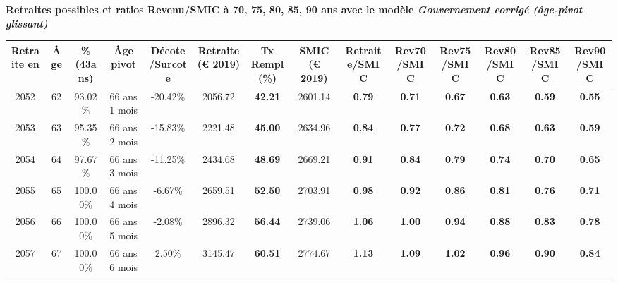  \vspace{0.1cm} 
{\bf \noindent Retraites possibles et ratios Revenu/SMIC à 70, 75, 80, 85, 90 ans avec le modèle \emph{Gouvernement corrigé (âge-pivot glissant)}}  
 
\begin{adjustbox}{max width=\textwidth} 
\begin{tabular}[htb]{|c|c||c|c|c||c|c||c||c|c|c|c|c|c|} 
\hline 
 Retraite en &  Âge &  \%(43ans) &  Âge pivot &  Décote/Surcote &  Retraite (\euro{} 2019) &  Tx Rempl(\%) &  SMIC (\euro{} 2019) &  Retraite/SMIC &  Rev70/SMIC &  Rev75/SMIC &  Rev80/SMIC &  Rev85/SMIC &  Rev90/SMIC \\ 
\hline \hline 
 2052 &  62 &  93.02\% &  66 ans 1 mois &  -20.42\% &  2056.72 &  {\bf 42.21} &  2601.14 &  {\bf {\color{red} 0.79}} &  {\bf {\color{red} 0.71}} &  {\bf {\color{red} 0.67}} &  {\bf {\color{red} 0.63}} &  {\bf {\color{red} 0.59}} &  {\bf {\color{red} 0.55}} \\ 
\hline 
 2053 &  63 &  95.35\% &  66 ans 2 mois &  -15.83\% &  2221.48 &  {\bf 45.00} &  2634.96 &  {\bf {\color{red} 0.84}} &  {\bf {\color{red} 0.77}} &  {\bf {\color{red} 0.72}} &  {\bf {\color{red} 0.68}} &  {\bf {\color{red} 0.63}} &  {\bf {\color{red} 0.59}} \\ 
\hline 
 2054 &  64 &  97.67\% &  66 ans 3 mois &  -11.25\% &  2434.68 &  {\bf 48.69} &  2669.21 &  {\bf {\color{red} 0.91}} &  {\bf {\color{red} 0.84}} &  {\bf {\color{red} 0.79}} &  {\bf {\color{red} 0.74}} &  {\bf {\color{red} 0.70}} &  {\bf {\color{red} 0.65}} \\ 
\hline 
 2055 &  65 &  100.00\% &  66 ans 4 mois &  -6.67\% &  2659.51 &  {\bf 52.50} &  2703.91 &  {\bf {\color{red} 0.98}} &  {\bf {\color{red} 0.92}} &  {\bf {\color{red} 0.86}} &  {\bf {\color{red} 0.81}} &  {\bf {\color{red} 0.76}} &  {\bf {\color{red} 0.71}} \\ 
\hline 
 2056 &  66 &  100.00\% &  66 ans 5 mois &  -2.08\% &  2896.32 &  {\bf 56.44} &  2739.06 &  {\bf 1.06} &  {\bf 1.00} &  {\bf {\color{red} 0.94}} &  {\bf {\color{red} 0.88}} &  {\bf {\color{red} 0.83}} &  {\bf {\color{red} 0.78}} \\ 
\hline 
 2057 &  67 &  100.00\% &  66 ans 6 mois &  2.50\% &  3145.47 &  {\bf 60.51} &  2774.67 &  {\bf 1.13} &  {\bf 1.09} &  {\bf 1.02} &  {\bf {\color{red} 0.96}} &  {\bf {\color{red} 0.90}} &  {\bf {\color{red} 0.84}} \\ 
\hline 
\hline 
\end{tabular} 
\end{adjustbox} 
 

